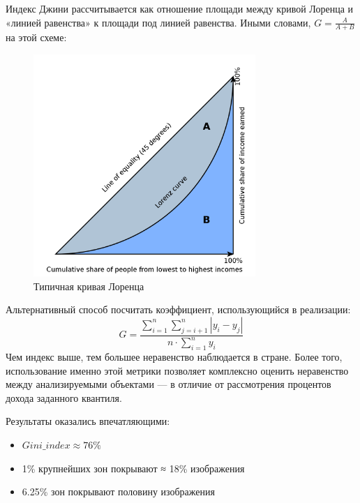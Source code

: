 \documentclass[11pt]{article}
\begin{document}
    Индекс Джини рассчитывается как отношение площади между кривой Лоренца и «линией равенства» к площади под линией равенства.
    Иными словами, $G = \frac{A}{A + B}$ на этой схеме:

    \begin{figure}[h!]\label{fig:lorenz_curve}
        \centering
        \includegraphics[width=0.75\textwidth]{typical_lorenz_curve.png}
        \caption{Типичная кривая Лоренца}
    \end{figure}
    Альтернативный способ посчитать коэффициент, использующийся в реализации:
    \begin{equation}
        G = \frac{\sum_{i=1}^{n}  \sum_{j=i+1}^{n}  \left| y_i - y_j \right|}{n \cdot \sum_{i=1}^{n} y_i}
    \end{equation}
    Чем индекс выше, тем большее неравенство наблюдается в стране.
    Более того, использование именно этой метрики позволяет комплексно оценить неравенство между анализируемыми объектами —
    в отличие от рассмотрения процентов дохода заданного квантиля.


    Результаты оказались впечатляющими:
    \begin{itemize}
        \item $Gini\_index \approx 76\%$
        \item 1\% крупнейших зон покрывают ≈ 18\% изображения
        \item 6.25\% зон покрывают половину изображения
    \end{itemize}
\end{document}
